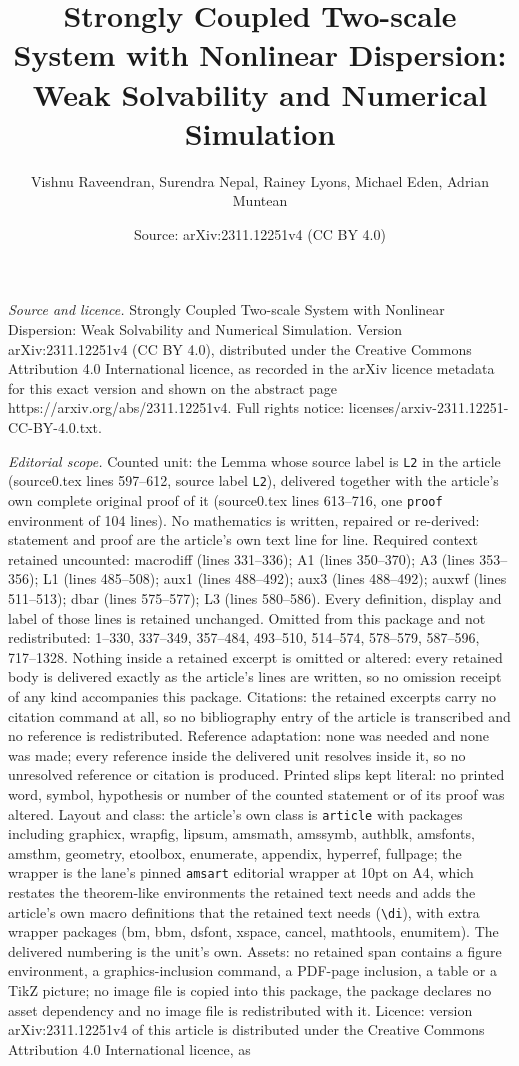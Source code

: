 \documentclass[10pt,a4paper]{amsart}
\title[Strongly Coupled Two-scale System with Nonlinear Dispersion:]{Strongly Coupled Two-scale System with Nonlinear Dispersion: Weak Solvability and Numerical Simulation}
\author{Vishnu Raveendran, Surendra Nepal, Rainey Lyons, Michael Eden, Adrian Muntean}
\date{Source: arXiv:2311.12251v4 (CC BY 4.0)}
\begin{document}
\maketitle

\noindent\emph{Source and licence.} Strongly Coupled Two-scale System with Nonlinear Dispersion: Weak Solvability and Numerical Simulation. Version arXiv:2311.12251v4 (CC BY 4.0), distributed under the Creative Commons Attribution 4.0 International licence, as recorded in the arXiv licence metadata for this exact version and shown on the abstract page https://arxiv.org/abs/2311.12251v4. Full rights notice: licenses/arxiv-2311.12251-CC-BY-4.0.txt.\par\smallskip

\noindent\textit{Editorial scope.} Counted unit: the Lemma whose source label is \texttt{L2} in the article (source0.tex lines 597--612, source label \texttt{L2}), delivered together with the article's own complete original proof of it (source0.tex lines 613--716, one \texttt{proof} environment of 104 lines). No mathematics is written, repaired or re-derived: statement and proof are the article's own text line for line. Required context retained uncounted: macrodiff (lines 331--336); A1 (lines 350--370); A3 (lines 353--356); L1 (lines 485--508); aux1 (lines 488--492); aux3 (lines 488--492); auxwf (lines 511--513); dbar (lines 575--577); L3 (lines 580--586). Every definition, display and label of those lines is retained unchanged. Omitted from this package and not redistributed: 1--330, 337--349, 357--484, 493--510, 514--574, 578--579, 587--596, 717--1328. Nothing inside a retained excerpt is omitted or altered: every retained body is delivered exactly as the article's lines are written, so no omission receipt of any kind accompanies this package. Citations: the retained excerpts carry no citation command at all, so no bibliography entry of the article is transcribed and no reference is redistributed. Reference adaptation: none was needed and none was made; every reference inside the delivered unit resolves inside it, so no unresolved reference or citation is produced. Printed slips kept literal: no printed word, symbol, hypothesis or number of the counted statement or of its proof was altered. Layout and class: the article's own class is \texttt{article} with packages including graphicx, wrapfig, lipsum, amsmath, amssymb, authblk, amsfonts, amsthm, geometry, etoolbox, enumerate, appendix, hyperref, fullpage; the wrapper is the lane's pinned \texttt{amsart} editorial wrapper at 10pt on A4, which restates the theorem-like environments the retained text needs and adds the article's own macro definitions that the retained text needs (\texttt{\textbackslash di}), with extra wrapper packages (bm, bbm, dsfont, xspace, cancel, mathtools, enumitem). The delivered numbering is the unit's own. Assets: no retained span contains a figure environment, a graphics-inclusion command, a PDF-page inclusion, a table or a TikZ picture; no image file is copied into this package, the package declares no asset dependency and no image file is redistributed with it. Licence: version arXiv:2311.12251v4 of this article is distributed under the Creative Commons Attribution 4.0 International licence, as 
\end{document}
